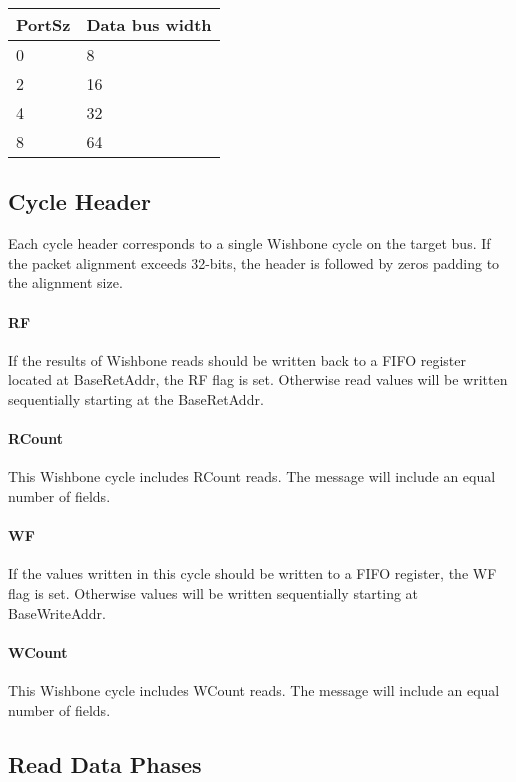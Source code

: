 \documentclass{article}
\begin{document}
\vspace{1em}
\begin{tabular}{|l|l|}
\hline
PortSz & Data bus width \\
\hline
0 & 8 \\
2 & 16 \\
4 & 32 \\
8 & 64 \\
\hline
\end{tabular}

\subsection{Cycle Header}

Each cycle header corresponds to a single Wishbone cycle on the target bus.
If the packet alignment exceeds 32-bits, 
the header is followed by zeros padding to the alignment size.

\paragraph{RF} \label{field:RF}
If the results of Wishbone reads should be written back to a FIFO register
located at BaseRetAddr, the RF flag is set.
Otherwise read values will be written sequentially starting at the
BaseRetAddr.

\paragraph{RCount} \label{field:RCount}
This Wishbone cycle includes RCount reads.
The message will include an equal number of  fields.

\paragraph{WF} \label{field:WF}
If the values written in this cycle should be written to a FIFO register,
the WF flag is set.
Otherwise values will be written sequentially starting at BaseWriteAddr.

\paragraph{WCount} \label{field:WCount}
This Wishbone cycle includes WCount reads.
The message will include an equal number of  fields.

\subsection{Read Data Phases}
\end{document}
